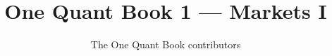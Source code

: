 \documentclass[11pt,a4paper,twoside,openany]{book}
\title{One Quant Book 1 --- Markets I}
\author{The One Quant Book contributors}
\date{\bookdate}
\begin{document}
\frontmatter



\tableofcontents

\mainmatter


\appendix
\part{\omsolutionspart}


\backmatter
\printindex
\end{document}
